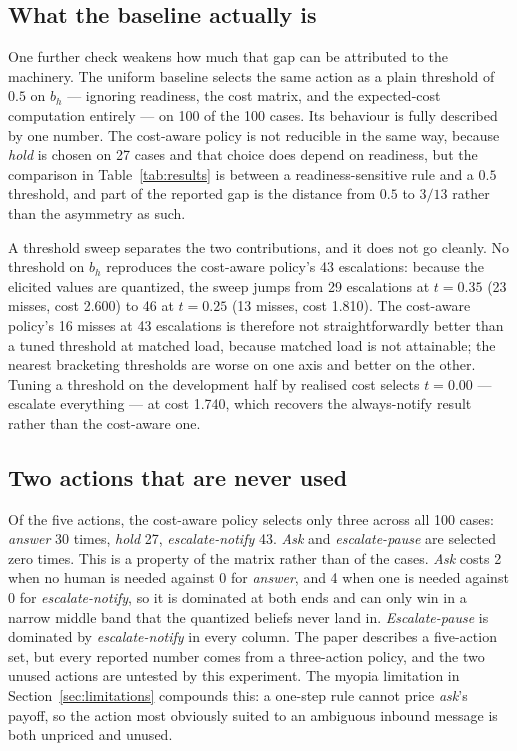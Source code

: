 \documentclass{article}
\begin{document}
\subsection{What the baseline actually is}
One further check weakens how much that gap can be attributed to the machinery.
The uniform baseline selects the same action as a plain threshold of $0.5$ on
$b_h$ --- ignoring readiness, the cost matrix, and the expected-cost computation
entirely --- on 100 of the 100 cases. Its behaviour is fully described by one
number. The cost-aware policy is not reducible in the same way, because
\emph{hold} is chosen on 27 cases and that choice does depend on readiness, but the
comparison in Table~\ref{tab:results} is between a readiness-sensitive rule and a
$0.5$ threshold, and part of the reported gap is the distance from $0.5$ to
$3/13$ rather than the asymmetry as such.

A threshold sweep separates the two contributions, and it does not go cleanly. No
threshold on $b_h$ reproduces the cost-aware policy's 43 escalations: because the
elicited values are quantized, the sweep jumps from 29 escalations at $t = 0.35$
(23 misses, cost 2.600) to 46 at $t = 0.25$ (13 misses, cost 1.810). The
cost-aware policy's 16 misses at 43 escalations is therefore not straightforwardly
better than a tuned threshold at matched load, because matched load is not
attainable; the nearest bracketing thresholds are worse on one axis and better on
the other. Tuning a threshold on the development half by realised cost selects
$t = 0.00$ --- escalate everything --- at cost 1.740, which recovers the
always-notify result rather than the cost-aware one.

\subsection{Two actions that are never used}
Of the five actions, the cost-aware policy selects only three across all 100
cases: \emph{answer} 30 times, \emph{hold} 27, \emph{escalate-notify} 43.
\emph{Ask} and \emph{escalate-pause} are selected zero times. This is a property of
the matrix rather than of the cases. \emph{Ask} costs 2 when no human is needed
against 0 for \emph{answer}, and 4 when one is needed against 0 for
\emph{escalate-notify}, so it is dominated at both ends and can only win in a
narrow middle band that the quantized beliefs never land in. \emph{Escalate-pause}
is dominated by \emph{escalate-notify} in every column. The paper describes a
five-action set, but every reported number comes from a three-action policy, and
the two unused actions are untested by this experiment. The myopia limitation in
Section~\ref{sec:limitations} compounds this: a one-step rule cannot price
\emph{ask}'s payoff, so the action most obviously suited to an ambiguous inbound
message is both unpriced and unused.
\end{document}
